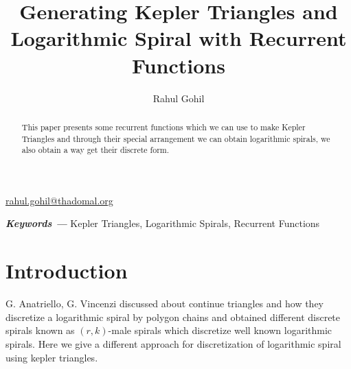 \documentclass{article}
\title{Generating Kepler Triangles and Logarithmic Spiral with Recurrent Functions}
\author{Rahul Gohil}
\affil{Student, B.E(Computer Engineering), Thadomal Shahani Engineering College, Mumbai, India}
\date{\vspace{-5ex}}
\providecommand{\keywords}[1]{\textbf{\textit{Keywords ---}} #1}
\begin{document}
\maketitle
\begin{center}
	\href{mailto:rahul.gohil@thadomal.org}{rahul.gohil@thadomal.org}
\end{center}

\begin{abstract}
This paper presents some recurrent functions which we can use to make Kepler Triangles and through their special arrangement we can obtain logarithmic spirals, we also obtain a way get their discrete form.     
\end{abstract}

\keywords{Kepler Triangles, Logarithmic Spirals, Recurrent Functions}

\section{Introduction}
G. Anatriello, G. Vincenzi\cite{paper1} discussed about continue triangles and how they discretize a logarithmic spiral by polygon chains and obtained different discrete spirals known as $(r, k)$-male spirals which discretize well known logarithmic spirals. Here we give a different approach for discretization of logarithmic spiral using kepler triangles. 
\end{document}
